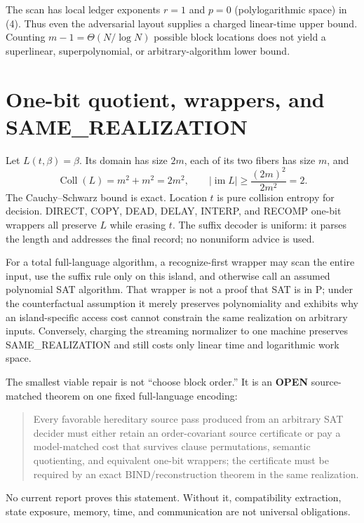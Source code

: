 \documentclass[11pt]{article}
\newcommand{\OPEN}{\textbf{OPEN}}
\begin{document}
The scan has local ledger exponents $r=1$ and $p=0$ (polylogarithmic space)
in (4).  Thus even the adversarial layout supplies a charged linear-time
upper bound.  Counting $m-1=\Theta(N/\log N)$ possible block locations does
not yield a superlinear, superpolynomial, or arbitrary-algorithm lower bound.

\section{One-bit quotient, wrappers, and SAME\_REALIZATION}

Let $L(t,\beta)=\beta$.  Its domain has size $2m$, each of its two fibers has
size $m$, and
\begin{equation}
 \operatorname{Coll}(L)=m^2+m^2=2m^2,
 \qquad
 |\operatorname{im}L|\ge\frac{(2m)^2}{2m^2}=2.                 \tag{6}
\end{equation}
The Cauchy--Schwarz bound is exact.  Location $t$ is pure collision entropy
for decision.  DIRECT, COPY, DEAD, DELAY, INTERP, and RECOMP one-bit wrappers
all preserve $L$ while erasing $t$.  The suffix decoder is uniform: it parses
the length and addresses the final record; no nonuniform advice is used.

For a total full-language algorithm, a recognize-first wrapper may scan the
entire input, use the suffix rule only on this island, and otherwise call an
assumed polynomial SAT algorithm.  That wrapper is not a proof that SAT is in
P; under the counterfactual assumption it merely preserves polynomiality and
exhibits why an island-specific access cost cannot constrain the same
realization on arbitrary inputs.  Conversely, charging the streaming
normalizer to one machine preserves SAME\_REALIZATION and still costs only
linear time and logarithmic work space.

The smallest viable repair is not ``choose block order.''  It is an \OPEN
source-matched theorem on one fixed full-language encoding:
\begin{quote}
Every favorable hereditary source pass produced from an arbitrary SAT
decider must either retain an order-covariant source certificate or pay a
model-matched cost that survives clause permutations, semantic quotienting,
and equivalent one-bit wrappers; the certificate must be required by an
exact BIND/reconstruction theorem in the same realization.
\end{quote}
No current report proves this statement.  Without it, compatibility
extraction, state exposure, memory, time, and communication are not universal
obligations.
\end{document}
